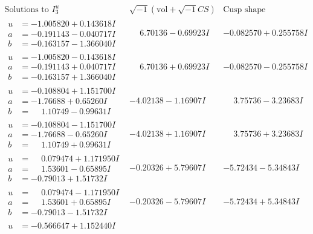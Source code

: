 \documentclass[1p]{elsarticle_modified}
\theoremstyle{definition}
\newcommand{\I}{\sqrt{-1}}
\begin{document}
$$\begin{array}{c|c|c}  
\text{Solutions to }I^u_{3}& \I (\text{vol} + \sqrt{-1}CS) & \text{Cusp shape}\\
 \hline 
\begin{aligned}
u &= -1.005820 + 0.143618 I \\
a &= -0.191143 - 0.040717 I \\
b &= -0.163157 - 1.366040 I\end{aligned}
 & \phantom{-}6.70136 - 0.69923 I & -0.082570 + 0.255758 I \\ \hline\begin{aligned}
u &= -1.005820 - 0.143618 I \\
a &= -0.191143 + 0.040717 I \\
b &= -0.163157 + 1.366040 I\end{aligned}
 & \phantom{-}6.70136 + 0.69923 I & -0.082570 - 0.255758 I \\ \hline\begin{aligned}
u &= -0.108804 + 1.151700 I \\
a &= -1.76688 + 0.65260 I \\
b &= \phantom{-}1.10749 - 0.99631 I\end{aligned}
 & -4.02138 - 1.16907 I & \phantom{-}3.75736 - 3.23683 I \\ \hline\begin{aligned}
u &= -0.108804 - 1.151700 I \\
a &= -1.76688 - 0.65260 I \\
b &= \phantom{-}1.10749 + 0.99631 I\end{aligned}
 & -4.02138 + 1.16907 I & \phantom{-}3.75736 + 3.23683 I \\ \hline\begin{aligned}
u &= \phantom{-}0.079474 + 1.171950 I \\
a &= \phantom{-}1.53601 - 0.65895 I \\
b &= -0.79013 + 1.51732 I\end{aligned}
 & -0.20326 + 5.79607 I & -5.72434 - 5.34843 I \\ \hline\begin{aligned}
u &= \phantom{-}0.079474 - 1.171950 I \\
a &= \phantom{-}1.53601 + 0.65895 I \\
b &= -0.79013 - 1.51732 I\end{aligned}
 & -0.20326 - 5.79607 I & -5.72434 + 5.34843 I \\ \hline\begin{aligned}
u &= -0.566647 + 1.152440 I \\

\end{aligned}
\end{array}$$
\end{document}
